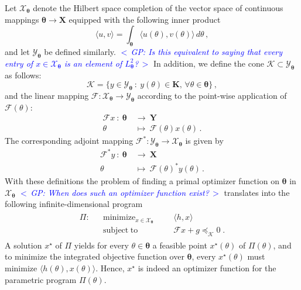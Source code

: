 \documentclass{article}
\DeclareMathOperator*{\minimize}{minimize}
\DeclareMathOperator*{\subj}{subject\;to}
\newcommand{\commentGP}[1]{\noindent \textcolor{blue}{\emph{$<\,$GP: #1$\,>$}}}%
\newcommand{\opt}{\star}                    %
\newcommand{\adj}{\ast}                     %
\newcommand{\ppar}{\theta}                          %
\newcommand{\Ppar}{{\bm{\theta}}}                   %
\newcommand{\X}{\mathbf{X}}                         %
\newcommand{\Y}{\mathbf{Y}}                         %
\newcommand{\K}{\mathbf{K}}                         %
\newcommand{\calF}{\mathcal{F}}                     %
\newcommand{\Xm}{{\bm{\mathcal{X}}_{\Ppar}}}        %
\newcommand{\Ym}{{\bm{\mathcal{Y}}_{\Ppar}}}        %
\newcommand{\Km}{{\bm{\mathcal{K}}}}                %
\begin{document}
Let $\Xm$ denote the Hilbert space completion of the vector space of continuous mappings $\Ppar \rightarrow \X$ equipped with the following inner product
\[ \langle u,v \rangle = \int_{\Ppar} \langle u(\ppar), v(\ppar) \rangle \, d\ppar\,,%
\]
and let $\Ym$ be defined similarly. \commentGP{Is this equivalent to saying that every entry of $x\in\Xm$ is an element of $L^2_\Ppar$?} In addition, we define the cone $\Km\subset\Ym$ as follows:
\[ \Km = \{y\in\Ym ~:~ y(\ppar)\in \K,\,\forall \ppar\in\Ppar\}\,,
\]
and the linear mapping $\calF:\Xm \rightarrow \Ym$ according to the point-wise application of $\calF(\ppar)$:
\begin{align*}
\calF x ~:~ \Ppar &~\rightarrow~ \Y \\
            \ppar &~\mapsto~ \calF(\ppar)x(\ppar)\,.
\end{align*}
The corresponding adjoint mapping $\calF^\adj:\Ym\rightarrow\Xm$ is given by
\begin{align*}
\calF^\adj y ~:~ \Ppar &~\rightarrow~ \X \\
                 \ppar &~\mapsto~ \calF(\ppar)^\adj y(\ppar)\,.
\end{align*}
With these definitions the problem of finding a primal optimizer function on $\Ppar$ in $\Xm$ \commentGP{When does such an optimizer function exist?} translates into the following infinite-dimensional program
\begin{gather}\label{eq:inf_primal}
\begin{aligned}
\Pi: && \minimize_{x\in\Xm} &&& \langle h, x \rangle\\
     && \subj               &&& \calF x + g \preceq_\Km 0 \;.%
\end{aligned}
\end{gather}
A solution $x^\opt$ of $\Pi$ yields for every $\ppar\in\Ppar$ a feasible point $x^\opt(\ppar)$ of $\Pi(\ppar)$, and to minimize the integrated objective function over $\Ppar$, every $x^\opt(\ppar)$ must minimize $\langle h(\ppar), x(\ppar) \rangle$. Hence, $x^\opt$ is indeed an optimizer function for the parametric program $\Pi(\ppar)$.
\end{document}
